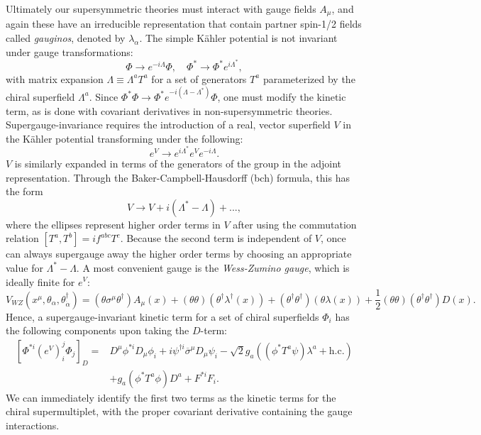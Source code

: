 Ultimately our supersymmetric theories must interact with gauge fields $A_{\mu}$, and again these have an irreducible representation that contain partner spin-1/2 fields called \textit{gauginos}, denoted by $\lambda_{\alpha}$. The simple K{\"a}hler potential is not invariant under gauge transformations:
\begin{equation}
\Phi \rightarrow e^{-i\Lambda}\Phi,\quad \Phi^{*} \rightarrow \Phi^{*}e^{i\Lambda^{*}},
\end{equation}
with matrix expansion $\Lambda \equiv \Lambda^{a}T^{a}$ for a set of generators $T^{a}$ parameterized by the chiral superfield $\Lambda^{a}$. Since $\Phi^{*}\Phi \rightarrow \Phi^{*}e^{-i(\Lambda-\Lambda^{*})}\Phi$, one must modify the kinetic term, as is done with covariant derivatives in non-supersymmetric theories. Supergauge-invariance requires the introduction of a real, vector superfield $V$ in the K{\"a}hler potential transforming under the following:
\begin{equation}
e^{V} \rightarrow e^{i\Lambda^*} e^{V} e^{-i\Lambda}.
\end{equation}
$V$ is similarly expanded in terms of the generators of the group in the adjoint representation. Through the Baker-Campbell-Hausdorff (\acrshort{bch}) formula, this has the form 
\begin{equation}
V \rightarrow V+i(\Lambda^{*}-\Lambda)+... ,
\end{equation}
where the ellipses represent higher order terms in $V$ after using the commutation relation $[T^{a},T^{b}]=if^{abc}T^{c}$. Because the second term is independent of $V$, once can always supergauge away the higher order terms by choosing an appropriate value for $\Lambda^{*}-\Lambda$. A most convenient gauge is the \textit{Wess-Zumino gauge}, which is ideally finite for $e^V$:
\begin{equation}
V_{WZ}(x^{\mu},\theta_{\alpha},\theta^{\dagger}_{\dot{\alpha}})=(\theta \sigma^{\mu} \theta^{\dagger})A_{\mu}(x) + (\theta \theta)(\theta^{\dagger} \lambda^{\dagger}(x)) + (\theta^{\dagger} \theta^{\dagger})(\theta \lambda(x)) + \frac{1}{2} (\theta \theta) (\theta^{\dagger} \theta^{\dagger}) D(x).
\end{equation}
Hence, a supergauge-invariant kinetic term for a set of chiral superfields $\Phi_i$ has the following components upon taking the $D$-term:
\begin{align}
\left[ \Phi^{*i}(e^V)^j_i \Phi_j\right]_{D}=&D^{\mu}\phi^{*i}D_{\mu}\phi_{i}+i\psi^{\dagger i}\overline{\sigma}^{\mu}D_{\mu}\psi_{i}-\sqrt{2}g_{a}((\phi^{*}T^{a}\psi)\lambda^{a}+\text{h.c.}) \nonumber \\
&+g_{a}(\phi^{*}T^{a}\phi)D^{a}+F^{*i}F_{i}.
\end{align}
We can immediately identify the first two terms as the kinetic terms for the chiral supermultiplet, with the proper covariant derivative containing the gauge interactions.

